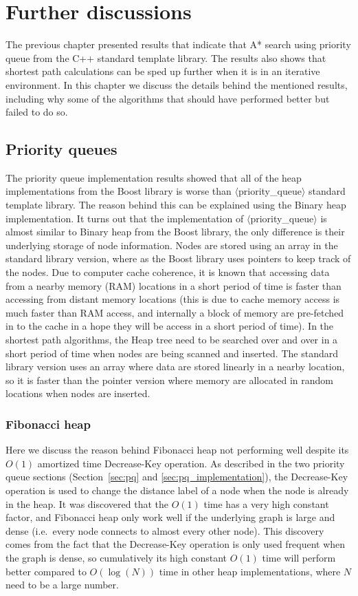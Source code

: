 \chapter{Further discussions}
The previous chapter presented results that indicate that A* search using priority queue from the C++ standard template library.
The results also shows that shortest path calculations can be sped up further when it is in an iterative environment.
In this chapter we discuss the details behind the mentioned results,
including why some of the algorithms that should have performed better but failed to do so.

\section{Priority queues}
The priority queue implementation results showed that
all of the heap implementations from the Boost library is worse than $\langle$priority\_queue$\rangle$ standard template library.
The reason behind this can be explained using the Binary heap implementation.
It turns out that the implementation of $\langle$priority\_queue$\rangle$ is almost similar to Binary heap from the Boost library,
the only difference is their underlying storage of node information.
Nodes are stored using an array in the standard library version,
where as the Boost library uses pointers to keep track of 
the nodes.
Due to computer cache coherence,
it is known that accessing data from a nearby memory (RAM) locations in a short period of time is faster than accessing from distant memory locations (this is due to cache memory access  is much faster than RAM access,
and internally a block of memory are pre-fetched in to the cache in a hope they will be access in a short period of time).
In the shortest path algorithms,
the Heap tree need to be searched over and over in a short period of time when nodes are being scanned and inserted.
The standard library version uses an array where data are stored linearly in a nearby location,
so it is faster than the pointer version where memory are allocated in random locations when nodes are inserted.

\subsection{Fibonacci heap}
Here we discuss the reason behind Fibonacci heap not performing well despite its $O(1)$ amortized time Decrease-Key operation.
As described in the two priority queue sections (Section~\ref{sec:pq} and \ref{sec:pq_implementation}),
the Decrease-Key operation is used to change the distance label of a node when the node is already in the heap.
It was discovered that the $O(1)$ time has a very high constant factor,
and Fibonacci heap only work well if the underlying graph is large and dense (i.e.\ every node connects to almost every other node).
This discovery comes from the fact that 
the Decrease-Key operation is only used frequent when the graph is dense,
so cumulatively its high constant $O(1)$ time will perform better compared to $O(\log(N))$ time in other heap implementations, where $N$ need to be a large number.

